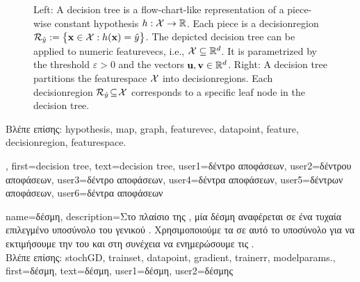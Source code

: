 {{\begin{figure}[H]
\begin{minipage}{.45\textwidth}
		\end{minipage}
		\caption{Left: A decision tree is a flow-chart-like representation of a piece-wise constant \gls{hypothesis} $h: \mathcal{X} \rightarrow \mathbb{R}$.  
		Each piece is a \gls{decisionregion} $\mathcal{R}_{\hat{y}} := \big\{ {\bf x} \in  \mathcal{X}: h({\bf x}) = \hat{y} \big\}$. 
		The depicted decision tree can be applied to numeric \gls{featurevec}s, i.e., $\mathcal{X} \subseteq \mathbb{R}^{d}$. It is 
		parametrized by the threshold $\varepsilon>0$ and the vectors ${\bf u}, {\bf v} \in \mathbb{R}^{d}$. 
		Right: A decision tree partitions  
		the \gls{featurespace} $\mathcal{X}$ into \gls{decisionregion}s. Each \gls{decisionregion}  
		$\mathcal{R}_{\hat{y}} \!\subseteq\!\mathcal{X}$ corresponds to a specific leaf node in the decision tree.}
		\label{fig_decision_tree_dict}
		\end{figure} 
		\foreignlanguage{greek}{Βλέπε επίσης:} \gls{hypothesis}, \gls{map}, \gls{graph}, \gls{featurevec}, \gls{datapoint}, \gls{feature}, \gls{decisionregion}, \gls{featurespace}.},
	first={decision tree},
	text={decision tree},
	user1={\foreignlanguage{greek}{δέντρο αποφάσεων}}, %
	user2={\foreignlanguage{greek}{δέντρου αποφάσεων}}, %
	user3={\foreignlanguage{greek}{δέντρο αποφάσεων}}, %
	user4={\foreignlanguage{greek}{δέντρα αποφάσεων}}, %
	user5={\foreignlanguage{greek}{δέντρων αποφάσεων}}, %
	user6={\foreignlanguage{greek}{δέντρα αποφάσεων}} %
}

{name={\foreignlanguage{greek}{δέσμη}},
	description={\foreignlanguage{greek}{Στο πλαίσιο της} 
		, \foreignlanguage{greek}{μία δέσμη αναφέρεται σε ένα τυχαία επιλεγμένο υποσύνολο 
		του γενικού} . \foreignlanguage{greek}{Χρησιμοποιούμε τα}  
		\foreignlanguage{greek}{σε αυτό το υποσύνολο για να εκτιμήσουμε την} 
		 \foreignlanguage{greek}{του}  \foreignlanguage{greek}{και στη συνέχεια 
		να ενημερώσουμε τις} .\\
		\foreignlanguage{greek}{Βλέπε επίσης:} \gls{stochGD}, \gls{trainset}, \gls{datapoint}, \gls{gradient}, \gls{trainerr}, \gls{modelparams}.}, 
	first={\foreignlanguage{greek}{δέσμη}},
	text={\foreignlanguage{greek}{δέσμη}},
	user1={\foreignlanguage{greek}{δέσμη}}, %
    	user2={\foreignlanguage{greek}{δέσμης}} %
}

